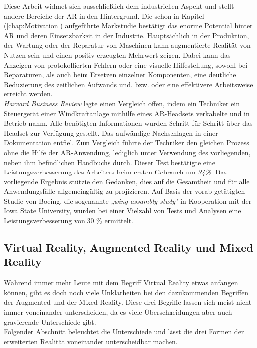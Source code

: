Diese Arbeit widmet sich ausschließlich dem industriellen Aspekt und stellt andere Bereiche der \acl{AR} in den Hintergrund. 
Die schon in Kapitel (\ref{chap:Motivation}) aufgeführte Markstudie bestätigt das enorme Potential hinter \acl{AR} und deren Einsetzbarkeit 
in der Industrie. Hauptsächlich in der Produktion, der Wartung oder der Reparatur von Maschinen kann augmentierte Realität von Nutzen sein 
und einen positiv erzeugten Mehrwert zeigen. Dabei kann das Anzeigen von protokollierten Fehlern oder eine visuelle 
Hilfestellung, sowohl bei Reparaturen, als auch beim Ersetzen einzelner Komponenten, eine deutliche Reduzierung des 
zeitlichen Aufwands und, bzw. oder eine effektivere Arbeitsweise erreicht werden. 
\\
\textit{Harvard Business Review} legte einen Vergleich offen, indem ein Techniker ein Steuergerät einer Windkraftanlage mithilfe 
eines \acs{AR}-Headsets verkabelte und in Betrieb nahm. Alle benötigten Informationen wurden Schritt für Schritt über das Headset zur Verfügung 
gestellt. Das aufwändige Nachschlagen in einer Dokumentation entfiel. Zum Vergleich führte der Techniker den gleichen Prozess ohne die Hilfe der AR-Anwendung, 
lediglich unter Verwendung des vorliegenden, neben ihm befindlichen Handbuchs durch.
Dieser Test bestätigte eine Leistungsverbesserung des Arbeiters beim ersten Gebrauch um \textit{34\%}.\cite{harvardbr.2017m} Das vorliegende Ergebnis stützte den 
Gedanken, dies auf die Gesamtheit und für alle Anwendungsfälle allgemeingültig zu projizieren. Auf Basis der 
vorab getätigten Studie von Boeing, die sogenannte \textit{„wing assambly study"} in Kooperation mit der Iowa State University, wurden 
bei einer Vielzahl von Tests und Analysen eine Leistungsverbesserung von 30 \% ermittelt. \cite{boeingStudy.2015a}


\subsection{Virtual Reality, Augmented Reality und Mixed Reality}
Während immer mehr Leute mit dem Begriff Virtual Reality etwas anfangen können, gibt es doch noch viele Unklarheiten bei den dazukommenden 
Begriffen der Augmented und der Mixed Reality. Diese drei Begriffe lassen sich meist nicht immer voneinander unterscheiden, da es viele 
Überschneidungen aber auch gravierende Unterschiede gibt. \cite{vr.2018n}
\\ 
Folgender Abschnitt beleuchtet die Unterschiede und lässt die drei Formen der erweiterten Realität voneinander unterscheidbar machen.
